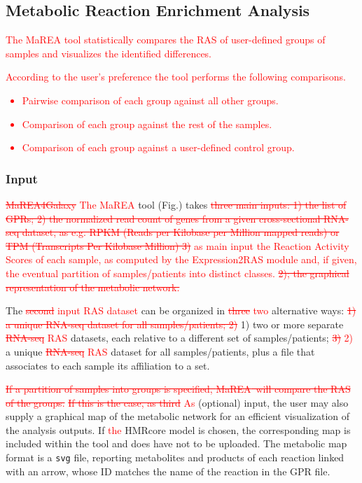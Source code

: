 \documentclass[preprint,12pt,authoryear]{elsarticle}
\newcommand{\red}{\textcolor{red}}
\newcommand{\mareagalaxy}{\textsf{MaREA4Galaxy}}
\newcommand{\mareaTool}{\textsf{MaREA}}
\newcommand{\RASTool}{\textsf{Expression2RAS}}
\begin{document}
\subsection{Metabolic Reaction Enrichment Analysis}

\red{The \mareaTool{} tool statistically compares the RAS of
  user-defined groups of samples \citep{marea} and visualizes the
  identified differences.}

\red{According to the user's preference the tool performs the
  following comparisons.
  \begin{itemize}
  \item Pairwise comparison of each group against all other groups.
  \item Comparison of each group against the rest of the samples.
  \item Comparison of each group against a user-defined control group.
  \end{itemize}}


\subsubsection{Input}

\red{\sout{\mareagalaxy} The \mareaTool{}} tool
(Fig.\label{fig:screenshot3}) takes \red{\sout{three main inputs: 1)
    the list of GPRs; 2) the normalized read count of genes from a
    given cross-sectional RNA-seq dataset, as e.g. RPKM (Reads per
    Kilobase per Million mapped reads) or TPM (Transcripts Per
    Kilobase Million) 3)} as main input the Reaction Activity Scores
  of each sample, as computed by the \RASTool{} module and\red{, if
    given,} the eventual partition of samples/patients into distinct
  classes. \sout{2); the graphical representation of the metabolic
    network.}}

The \red{\sout{second} input RAS dataset} can be organized in
\red{\sout{three} two} alternative ways: \red{\sout{1) a unique
    RNA-seq  dataset for all samples/patients; 2)}} 1) two or more
separate \red{\sout{RNA-seq} RAS} datasets, each relative to a
different set of samples/patients; \red{\sout{3)} 2)} a unique
\red{\sout{RNA-seq} RAS} dataset for all samples/patients, plus a file
that associates to each sample its affiliation to a set.

\red{\sout{If a partition of samples into groups is specified,
    \mareaTool\ will compare the RAS of the groups.}} \red{\sout{If
    this is the case, as third} As} (optional) input, the user may
also supply a graphical map of the metabolic network for an efficient
visualization of the analysis outputs. If \red{the} \textsf{HMRcore}
model is chosen, the corresponding map is included within the tool and
does have not to be uploaded. The metabolic map format is a
\texttt{svg} file, reporting metabolites and products of each reaction
linked with an arrow, whose ID matches the name of the reaction in the
GPR file.
\end{document}

